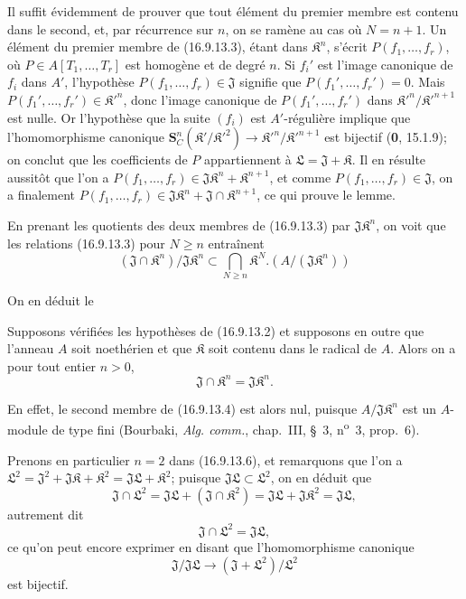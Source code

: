 Il suffit évidemment de prouver que tout élément du premier membre est
contenu dans le second, et, par récurrence sur $n$, on se ramène au cas où
$N=n+1$. Un élément du premier membre de (16.9.13.3), étant dans
$\mathfrak{K}^n$, s'écrit $P(f_1,\ldots,f_r)$, où
$P\in A[T_1,\ldots,T_r]$ est homogène et de degré $n$. Si $f_i'$ est l'image
canonique de $f_i$ dans $A'$, l'hypothèse
$P(f_1,\ldots,f_r)\in\mathfrak{J}$ signifie que
$P(f_1',\ldots,f_r')=0$. Mais
$P(f_1',\ldots,f_r')\in\mathfrak{K}'^n$, donc l'image canonique de
$P(f_1',\ldots,f_r')$ dans
$\mathfrak{K}'^n/\mathfrak{K}'^{n+1}$ est nulle. Or l'hypothèse que la suite
$(f_i)$ est $A'$-régulière implique que l'homomorphisme canonique
$\mathbf{S}_C^n(\mathfrak{K}'/\mathfrak{K}'^2)\to\mathfrak{K}'^n/\mathfrak{K}'^{n+1}$ est bijectif (\textbf{0}, 15.1.9); on conclut que les coefficients de $P$ appartiennent
à $\mathfrak{L}=\mathfrak{J}+\mathfrak{K}$. Il en résulte aussitôt que l'on a
$P(f_1,\ldots,f_r)\in\mathfrak{J}\mathfrak{K}^n+\mathfrak{K}^{n+1}$, et comme
$P(f_1,\ldots,f_r)\in\mathfrak{J}$, on a finalement
$P(f_1,\ldots,f_r)\in\mathfrak{J}\mathfrak{K}^n+\mathfrak{J}\cap\mathfrak{K}^{n+1}$, ce qui prouve le lemme.

En prenant les quotients des deux membres de (16.9.13.3) par
$\mathfrak{J}\mathfrak{K}^n$, on voit que les relations (16.9.13.3) pour
$N\geq n$ entraînent
\[
  (\mathfrak{J}\cap\mathfrak{K}^n)/\mathfrak{J}\mathfrak{K}^n
  \subset\bigcap_{N\geq n}\mathfrak{K}^N
    .(A/(\mathfrak{J}\mathfrak{K}^n))
  \tag{16.9.13.4}
  \label{IV.16.9.13.4}
\]

On en déduit le

\begin{corollary}[16.9.13.5]
\label{IV.16.9.13.5}
Supposons vérifiées les hypothèses de \textup{(16.9.13.2)} et supposons en outre que
l'anneau $A$ soit noethérien et que $\mathfrak{K}$ soit contenu dans le
radical de $A$. Alors on a pour tout entier $n>0$,
\[
  \mathfrak{J}\cap\mathfrak{K}^n=\mathfrak{J}\mathfrak{K}^n.
  \tag{16.9.13.6}
  \label{IV.16.9.13.6}
\]
\end{corollary}

En effet, le second membre de (16.9.13.4) est alors nul, puisque
$A/\mathfrak{J}\mathfrak{K}^n$ est un $A$-module de type fini (Bourbaki,
\emph{Alg. comm.}, chap.~III, §~3, n\textsuperscript{o}~3, prop.~6).

Prenons en particulier $n=2$ dans (16.9.13.6), et remarquons que l'on a
$\mathfrak{L}^2=\mathfrak{J}^2+\mathfrak{J}\mathfrak{K}+\mathfrak{K}^2
=\mathfrak{J}\mathfrak{L}+\mathfrak{K}^2$; puisque
$\mathfrak{J}\mathfrak{L}\subset\mathfrak{L}^2$, on en déduit que
\[
  \mathfrak{J}\cap\mathfrak{L}^2
  =\mathfrak{J}\mathfrak{L}+(\mathfrak{J}\cap\mathfrak{K}^2)
  =\mathfrak{J}\mathfrak{L}+\mathfrak{J}\mathfrak{K}^2
  =\mathfrak{J}\mathfrak{L},
\]
autrement dit
\[
  \mathfrak{J}\cap\mathfrak{L}^2=\mathfrak{J}\mathfrak{L},
  \tag{16.9.13.7}
  \label{IV.16.9.13.7}
\]
ce qu'on peut encore exprimer en disant que l'homomorphisme canonique
\[
  \mathfrak{J}/\mathfrak{J}\mathfrak{L}
  \longrightarrow(\mathfrak{J}+\mathfrak{L}^2)/\mathfrak{L}^2
\]
est bijectif.

